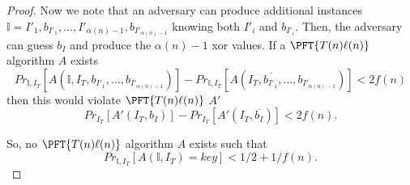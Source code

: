 \begin{proof}
Now we note that an adversary can produce additional instances $\mathbb{I} = I'_1,b_{I'_1}, \ldots, I'_{\alpha(n)-1},b_{I'_{\alpha(n)-1}}$ knowing both $I'_i$ and $b_{I'_i}$. Then, the adversary can guess $b_I$ and produce the $\alpha(n)-1$ xor values. If a $\PFT{T(n)\ell(n)}$ algorithm $A$ exists 
$$Pr_{\mathbb{I},I_T}[A(\mathbb{I},I_T,b_{I'_1},\ldots, b_{I'_{\alpha(n)-1}})] -Pr_{\mathbb{I},I_T}[A(I_T,\overline{b_{I'_1}},\ldots,b_{I'_{\alpha(n)-1}})]< 2f(n)$$
then this would violate $\PFT{T(n)\ell(n)}$ $A'$ 
$$Pr_{I_T}[A'(I_T,b_I)] -Pr_{I_T}[A'(I_T,\overline{b_I})]< 2f(n).$$

So, no $\PFT{T(n)\ell(n)}$ algorithm $A$ exists such that 
$$Pr_{\mathbb{I},I_T}[A(\mathbb{I},I_T)=key]<1/2+1/f(n).$$	
\end{proof}